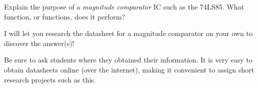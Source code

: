 

Explain the purpose of a {\it magnitude comparator} IC such as the 74LS85.  What function, or functions, does it perform?







I will let you research the datasheet for a magnitude comparator on your own to discover the answer(s)!







Be sure to ask students where they obtained their information.  It is very easy to obtain datasheets online (over the internet), making it convenient to assign short research projects such as this.




